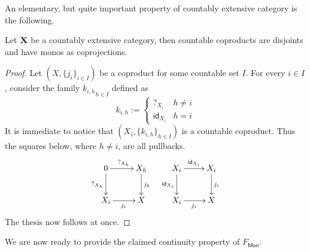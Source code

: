 \documentclass[runningheads,envcountsect]{llncs}
\def\X{\textbf {\textup{X}}}
\newcommand{\mo}[1]{{#1}_\mathsf{Mon}}
\newcommand{\id}[1]{\mathsf{id}_{#1}}
\begin{document}
An elementary, but quite important property of countably extensive category is the following.

\begin{proposition}\label{prop:inj}
Let $\X$ be a countably extensive category, then countable coproducts are disjoints and have monos as coprojections. 
\end{proposition}
\begin{proof}
Let $(X, \{j_i\}_{i\in I})$ be a coproduct for some countable set $I$. For every $i\in I$, consider the family ${k_{i, h}}_{h\in I}$ defined as
\[k_{i, h}:=\begin{cases}
	?_{X_{i}} & h\neq i\\
	\id{X_i} &h=i
\end{cases}\]
It is immediate to notice that $(X_{i}, \{k_{i,h}\}_{h\in I})$ is a countable coproduct. Thus the squares below, where $h\neq i$, are all pullbacks.
	\[\xymatrix{0 \ar[r]^{?_{X_h}} \ar[d]_{?_{X_h}}& X_h \ar[d]^{j_h} & X_i \ar[r]^{\id{X_i}} \ar[d]_{\id{X_i}}& X_i \ar[d]^{j_i}\\ X_i \ar[r]_{j_i} & X & X_i \ar[r]_{j_i} & X}\]
	The thesis now follows at once.
\end{proof}

We are now ready to provide the claimed continuity property of $\mo{F}$.
\end{document}
